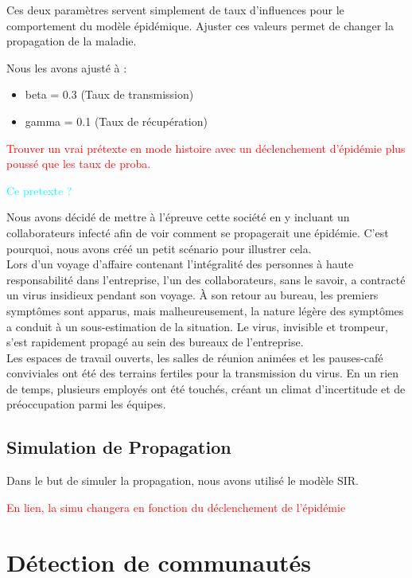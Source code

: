 \documentclass{article}
\begin{document}
Ces deux paramètres servent simplement de taux d'influences pour le comportement du modèle épidémique. Ajuster ces valeurs permet de changer la propagation de la maladie.

Nous les avons ajusté à :
\begin{itemize}
    \item beta = 0.3 (Taux de transmission)
    \item gamma = 0.1 (Taux de récupération)
\end{itemize}

\textcolor{red}{Trouver un vrai prétexte en mode histoire avec un déclenchement d'épidémie plus poussé que les taux de proba.}

\textcolor{cyan}{Ce pretexte ?}

Nous avons décidé de mettre à l'épreuve cette société en y incluant un collaborateurs infecté afin de voir comment se propagerait une épidémie. C'est pourquoi, nous avons créé un petit scénario pour illustrer cela. \\

Lors d'un voyage d'affaire contenant l'intégralité des personnes à haute responsabilité dans l'entreprise, l'un des collaborateurs, sans le savoir, a contracté un virus insidieux pendant son voyage. À son retour au bureau, les premiers symptômes sont apparus, mais malheureusement, la nature légère des symptômes a conduit à un sous-estimation de la situation. Le virus, invisible et trompeur, s'est rapidement propagé au sein des bureaux de l'entreprise. \\

Les espaces de travail ouverts, les salles de réunion animées et les pauses-café conviviales ont été des terrains fertiles pour la transmission du virus. En un rien de temps, plusieurs employés ont été touchés, créant un climat d'incertitude et de préoccupation parmi les équipes.

\subsection{Simulation de Propagation}

Dans le but de simuler la propagation, nous avons utilisé le modèle SIR.

\textcolor{red}{En lien, la simu changera en fonction du déclenchement de l'épidémie}

\section{Détection de communautés}
\end{document}
